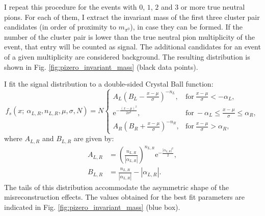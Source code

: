 I repeat this procedure for the events with $0$, $1$, $2$ and $3$ or more true neutral pions. For each of them, I extract the invariant mass of the first three cluster pair candidates (in order of proximity to $m_{\pi^{0}}$), in case they can be formed. If the number of the cluster pair is lower than the true neutral pion multiplicity of the event, that entry will be counted as signal. The additional candidates for an event of a given multiplicity are considered background. The resulting distribution is shown in Fig. \ref{fig:pizero_invariant_mass} (black data points).

I fit the signal distribution to a double-sided Crystal Ball function:
\begin{equation}
    f_{s} (x; ~\alpha_{L,R}, n_{L,R}, \mu, \sigma, N) = N \left\{
    \begin{array}{ll}
        A_{L} \left(B_{L} - \frac{x - \mu}{\sigma}\right)^{-n_{L}}, & \mathrm{for} \ \frac{x - \mu}{\sigma} < -\alpha_{L},\\
        \mathrm{e}^{-\frac{(x-\mu)^{2}}{2 \sigma^{2}}}, & \mathrm{for} \ -\alpha_{L} \leq \frac{x - \mu}{\sigma} \leq \alpha_{R},\\
        A_{R} \left(B_{R} + \frac{x - \mu}{\sigma}\right)^{-n_{R}}, & \mathrm{for} \ \frac{x - \mu}{\sigma} > \alpha_{R},
    \end{array}
    \right.
\end{equation}
where $A_{L,R}$ and $B_{L,R}$ are given by:
\begin{equation}
\begin{split}
    A_{L,R} &= \left(\frac{n_{L,R}}{|\alpha_{L,R}|}\right)^{n_{L,R}} \mathrm{e}^{-\frac{|\alpha_{L,R}|^{2}}{2}},\\
    B_{L,R} &= \frac{n_{L,R}}{|\alpha_{L,R}|}-|\alpha_{L,R}|.
\end{split}
\end{equation}
The tails of this distribution accommodate the asymmetric shape of the misreconstruction effects. The values obtained for the best fit parameters are indicated in Fig. \ref{fig:pizero_invariant_mass} (blue box).

